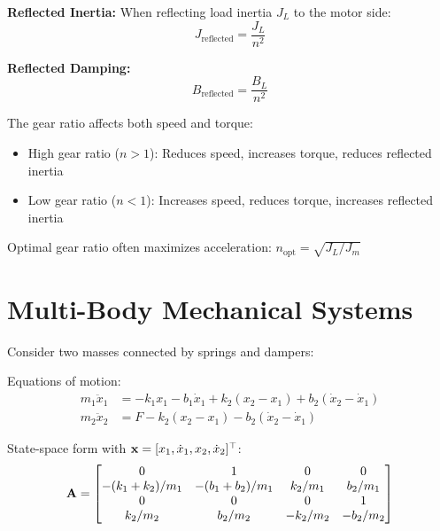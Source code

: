 \textbf{Reflected Inertia:}
When reflecting load inertia $J_L$ to the motor side:
\begin{equation}
J_{\text{reflected}} = \frac{J_L}{n^2}
\end{equation}

\textbf{Reflected Damping:}
\begin{equation}
B_{\text{reflected}} = \frac{B_L}{n^2}
\end{equation}

\begin{keyconceptbox}[title=Gear Ratio Selection]
The gear ratio affects both speed and torque:
\begin{itemize}
    \item High gear ratio ($n > 1$): Reduces speed, increases torque, reduces reflected inertia
    \item Low gear ratio ($n < 1$): Increases speed, reduces torque, increases reflected inertia
\end{itemize}
Optimal gear ratio often maximizes acceleration: $n_{\text{opt}} = \sqrt{J_L/J_m}$
\end{keyconceptbox}

\section{Multi-Body Mechanical Systems}
\label{sec:multibody}

\begin{examplebox}[title=Example 1.5: Two-Mass System]
Consider two masses connected by springs and dampers:



Equations of motion:
\begin{align}
m_1\ddot{x}_1 &= -k_1 x_1 - b_1\dot{x}_1 + k_2(x_2 - x_1) + b_2(\dot{x}_2 - \dot{x}_1) \\
m_2\ddot{x}_2 &= F - k_2(x_2 - x_1) - b_2(\dot{x}_2 - \dot{x}_1)
\end{align}

State-space form with $\mathbf{x} = [x_1, \dot{x}_1, x_2, \dot{x}_2]^\top$:
\begin{equation}
\mathbf{A} = \begin{bmatrix}
0 & 1 & 0 & 0 \\
-(k_1+k_2)/m_1 & -(b_1+b_2)/m_1 & k_2/m_1 & b_2/m_1 \\
0 & 0 & 0 & 1 \\
k_2/m_2 & b_2/m_2 & -k_2/m_2 & -b_2/m_2
\end{bmatrix}
\end{equation}
\end{examplebox}


